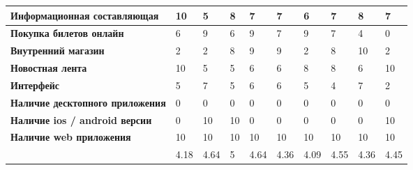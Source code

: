\begin{table}[h]
\begin{tabular}{llllllllll}
		\multicolumn{1}{|l|}{\textbf{Информационная составляющая}} & \multicolumn{1}{l|}{10} & \multicolumn{1}{l|}{5} & \multicolumn{1}{l|}{8} & \multicolumn{1}{l|}{7} & \multicolumn{1}{l|}{7} & \multicolumn{1}{l|}{6} & \multicolumn{1}{l|}{7} & \multicolumn{1}{l|}{8} & \multicolumn{1}{l|}{7} \\ \hline
		\multicolumn{1}{|l|}{\textbf{Покупка билетов онлайн}} & \multicolumn{1}{l|}{6} & \multicolumn{1}{l|}{9} & \multicolumn{1}{l|}{6} & \multicolumn{1}{l|}{9} & \multicolumn{1}{l|}{7} & \multicolumn{1}{l|}{9} & \multicolumn{1}{l|}{7} & \multicolumn{1}{l|}{4} & \multicolumn{1}{l|}{0} \\ \hline
		\multicolumn{1}{|l|}{\textbf{Внутренний магазин}} & \multicolumn{1}{l|}{2} & \multicolumn{1}{l|}{2} & \multicolumn{1}{l|}{8} & \multicolumn{1}{l|}{9} & \multicolumn{1}{l|}{9} & \multicolumn{1}{l|}{2} & \multicolumn{1}{l|}{8} & \multicolumn{1}{l|}{10} & \multicolumn{1}{l|}{2} \\ \hline
		\multicolumn{1}{|l|}{\textbf{Новостная лента}} & \multicolumn{1}{l|}{10} & \multicolumn{1}{l|}{5} & \multicolumn{1}{l|}{5} & \multicolumn{1}{l|}{6} & \multicolumn{1}{l|}{6} & \multicolumn{1}{l|}{8} & \multicolumn{1}{l|}{8} & \multicolumn{1}{l|}{6} & \multicolumn{1}{l|}{10} \\ \hline
		\multicolumn{1}{|l|}{\textbf{Интерфейс}} & \multicolumn{1}{l|}{5} & \multicolumn{1}{l|}{7} & \multicolumn{1}{l|}{5} & \multicolumn{1}{l|}{6} & \multicolumn{1}{l|}{6} & \multicolumn{1}{l|}{5} & \multicolumn{1}{l|}{4} & \multicolumn{1}{l|}{7} & \multicolumn{1}{l|}{2} \\ \hline
		\multicolumn{1}{|l|}{\textbf{Наличие десктопного приложения}} & \multicolumn{1}{l|}{0} & \multicolumn{1}{l|}{0} & \multicolumn{1}{l|}{0} & \multicolumn{1}{l|}{0} & \multicolumn{1}{l|}{0} & \multicolumn{1}{l|}{0} & \multicolumn{1}{l|}{0} & \multicolumn{1}{l|}{0} & \multicolumn{1}{l|}{0} \\ \hline
		\multicolumn{1}{|l|}{\textbf{Наличие ios / android версии}} & \multicolumn{1}{l|}{0} & \multicolumn{1}{l|}{10} & \multicolumn{1}{l|}{10} & \multicolumn{1}{l|}{0} & \multicolumn{1}{l|}{0} & \multicolumn{1}{l|}{0} & \multicolumn{1}{l|}{0} & \multicolumn{1}{l|}{0} & \multicolumn{1}{l|}{10} \\ \hline
		\multicolumn{1}{|l|}{\textbf{Наличие web приложения}} & \multicolumn{1}{l|}{10} & \multicolumn{1}{l|}{10} & \multicolumn{1}{l|}{10} & \multicolumn{1}{l|}{10} & \multicolumn{1}{l|}{10} & \multicolumn{1}{l|}{10} & \multicolumn{1}{l|}{10} & \multicolumn{1}{l|}{10} & \multicolumn{1}{l|}{10} \\ \hline
		& 4.18 & 4.64 & 5 & 4.64 & 4.36 & 4.09 & 4.55 & 4.36 & 4.45
	\end{tabular}
\end{table}
